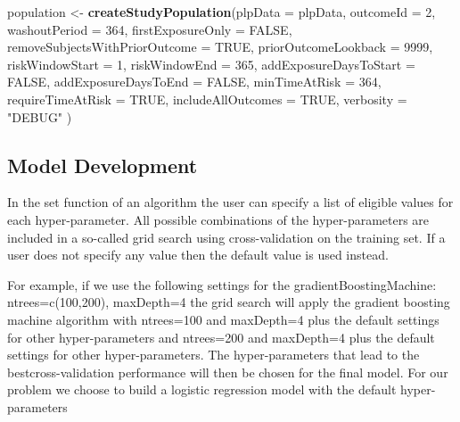 \documentclass[]{book}
\newenvironment{Shaded}{\begin{snugshade}}{\end{snugshade}}
\newcommand{\KeywordTok}[1]{\textcolor[rgb]{0.13,0.29,0.53}{\textbf{#1}}}
\newcommand{\DataTypeTok}[1]{\textcolor[rgb]{0.13,0.29,0.53}{#1}}
\newcommand{\DecValTok}[1]{\textcolor[rgb]{0.00,0.00,0.81}{#1}}
\newcommand{\StringTok}[1]{\textcolor[rgb]{0.31,0.60,0.02}{#1}}
\newcommand{\OtherTok}[1]{\textcolor[rgb]{0.56,0.35,0.01}{#1}}
\newcommand{\NormalTok}[1]{#1}
\begin{document}
\begin{Shaded}
\begin{Highlighting}[]
\NormalTok{population <-}\StringTok{ }\KeywordTok{createStudyPopulation}\NormalTok{(}\DataTypeTok{plpData =}\NormalTok{ plpData,}
                                    \DataTypeTok{outcomeId =} \DecValTok{2}\NormalTok{,}
                                    \DataTypeTok{washoutPeriod =} \DecValTok{364}\NormalTok{,}
                                    \DataTypeTok{firstExposureOnly =} \OtherTok{FALSE}\NormalTok{,}
                                    \DataTypeTok{removeSubjectsWithPriorOutcome =} \OtherTok{TRUE}\NormalTok{,}
                                    \DataTypeTok{priorOutcomeLookback =} \DecValTok{9999}\NormalTok{,}
                                    \DataTypeTok{riskWindowStart =} \DecValTok{1}\NormalTok{,}
                                    \DataTypeTok{riskWindowEnd =} \DecValTok{365}\NormalTok{,}
                                    \DataTypeTok{addExposureDaysToStart =} \OtherTok{FALSE}\NormalTok{,}
                                    \DataTypeTok{addExposureDaysToEnd =} \OtherTok{FALSE}\NormalTok{,}
                                    \DataTypeTok{minTimeAtRisk =} \DecValTok{364}\NormalTok{,}
                                    \DataTypeTok{requireTimeAtRisk =} \OtherTok{TRUE}\NormalTok{,}
                                    \DataTypeTok{includeAllOutcomes =} \OtherTok{TRUE}\NormalTok{,}
                                    \DataTypeTok{verbosity =} \StringTok{"DEBUG"}
\NormalTok{)}
\end{Highlighting}
\end{Shaded}

\subsection{Model Development}\label{model-development}

In the set function of an algorithm the user can specify a list of
eligible values for each hyper-parameter. All possible combinations of
the hyper-parameters are included in a so-called grid search using
cross-validation on the training set. If a user does not specify any
value then the default value is used instead.

For example, if we use the following settings for the
gradientBoostingMachine: ntrees=c(100,200), maxDepth=4 the grid search
will apply the gradient boosting machine algorithm with ntrees=100 and
maxDepth=4 plus the default settings for other hyper-parameters and
ntrees=200 and maxDepth=4 plus the default settings for other
hyper-parameters. The hyper-parameters that lead to the
bestcross-validation performance will then be chosen for the final
model. For our problem we choose to build a logistic regression model
with the default hyper-parameters
\end{document}
